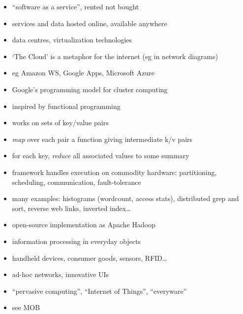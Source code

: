 \documentclass{sepslide-soa-faked} %
\begin{document}
\begin{slide}
\begin{itemize}
\item ``software as a service'', rented not bought
\item services and data hosted online, available anywhere
\item data centres, virtualization technologies
\item `The Cloud' is a metaphor for the internet (eg in network diagrams)
\item eg Amazon WS, Google Apps, Microsoft Azure
\end{itemize}
\end{slide}

\begin{slide}
\begin{itemize}
\item Google's programming model for cluster computing
\item inspired by functional programming
\item works on sets of key/value pairs
\item \emph{map} over each pair a function giving intermediate k/v pairs
\item for each key, \emph{reduce} all associated values to some summary
\item framework handles execution on commodity hardware: partitioning, scheduling, communication, fault-tolerance
\item many examples: histograms (wordcount, access stats), distributed grep and sort, reverse web links, inverted index\ldots
\item open-source implementation as Apache Hadoop
\end{itemize}
\end{slide}

\begin{slide}
\begin{itemize}
\item information processing in everyday objects
\item handheld devices, consumer goods, sensors, RFID\ldots
\item ad-hoc networks, innovative UIs
\item ``pervasive computing'', ``Internet of Things'', ``everyware''
\item see MOB
\end{itemize}
\end{slide}

\begin{slide}
  \Listofslides
\end{slide}

\begin{slide}
  \Timetable
\end{slide}
\end{document}
